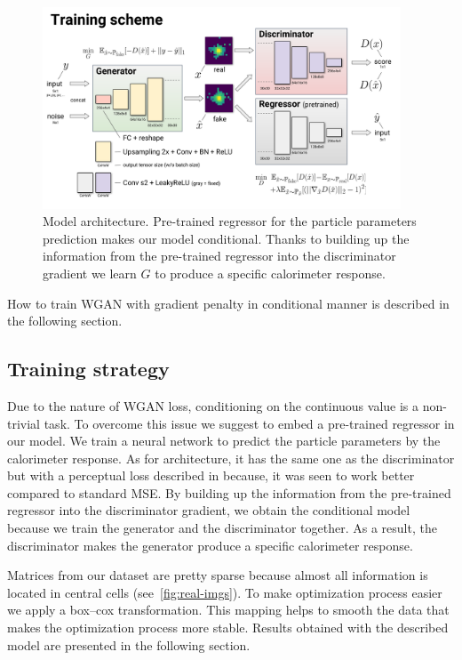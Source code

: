 \begin{figure}
\centering
\includegraphics[width=0.95\textwidth]{figures/model_architecture.pdf}
\caption{Model architecture. Pre-trained regressor for the particle parameters prediction makes our model conditional. Thanks to building up the information from the pre-trained regressor into the discriminator gradient we learn $G$ to produce a specific calorimeter response.}\label{fig:model}
\end{figure}

How to train WGAN with gradient penalty in conditional manner is described in the following section.

\subsection{Training strategy} \label{sec:training_strategy}
Due to the nature of WGAN loss, conditioning on the continuous value is a non-trivial task. To overcome this issue we suggest to embed a pre-trained regressor in our model. We train a neural network to predict the particle parameters by the calorimeter response. As for architecture, it has the same one as the discriminator but with a perceptual loss described in \cite{johnson2016perceptual} because, it was seen to work better compared to standard MSE. By building up the information from the pre-trained regressor into the discriminator gradient, we obtain the conditional model because we train the generator and the discriminator together. As a result, the discriminator makes the generator produce a specific calorimeter response.

Matrices from our dataset are pretty sparse because almost all information is located in central cells (see~\cref{fig:real-imgs}). To make optimization process easier we apply a box--cox transformation. This mapping helps to smooth the data that makes the optimization process more stable.
Results obtained with the described model are presented in the following section.

